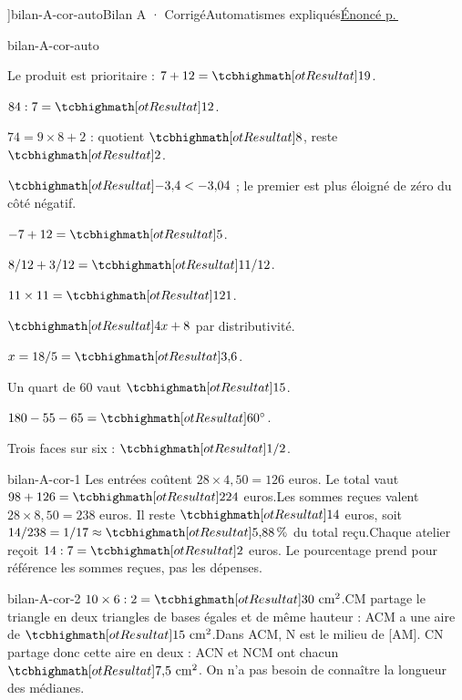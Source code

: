 \editionPage[\pdfbookmark[0]{Corrigés des bilans}{bm-bilan-A-cor-auto-parent}]{bilan-A-cor-auto}{Bilan A · Corrigé}{Automatismes expliqués}{\hyperref[bilan-A-auto]{Énoncé p.\,\pageref*{bilan-A-auto}}}
\begin{blocEdition}{bilan-A-cor-auto}
\begin{questions}
\item Le produit est prioritaire : $7+12=\res{19}$.
\item $84:7=\res{12}$.
\item $74=9\times8+2$ : quotient $\res8$, reste $\res2$.
\item $\res{-3{,}4<-3{,}04}$ ; le premier est plus éloigné de zéro du côté négatif.
\item $-7+12=\res5$.
\item $8/12+3/12=\res{11/12}$.
\item $11\times11=\res{121}$.
\item $\res{4x+8}$ par distributivité.
\item $x=18/5=\res{3{,}6}$.
\item Un quart de 60 vaut $\res{15}$.
\item $180-55-65=\res{60^\circ}$.
\item Trois faces sur six : $\res{1/2}$.\end{questions}
\end{blocEdition}
\begin{blocEdition}{bilan-A-cor-1}
Les entrées coûtent $28\times4{,}50=126$ euros. Le total vaut $98+126=\res{224}$ euros.Les sommes reçues valent $28\times8{,}50=238$ euros. Il reste $\res{14}$ euros, soit $14/238=1/17\approx\res{5{,}88\,\%}$ du total reçu.Chaque atelier reçoit $14:7=\res2$ euros. Le pourcentage prend pour référence les sommes reçues, pas les dépenses.
\end{blocEdition}
\begin{blocEdition}{bilan-A-cor-2}
$10\times6:2=\res{30\ \mathrm{cm}^2}$.CM partage le triangle en deux triangles de bases égales et de même hauteur : ACM a une aire de $\res{15\ \mathrm{cm}^2}$.Dans ACM, N est le milieu de [AM]. CN partage donc cette aire en deux : ACN et NCM ont chacun $\res{7{,}5\ \mathrm{cm}^2}$. On n’a pas besoin de connaître la longueur des médianes.\label{fig-bilan-A-cor-2}

\end{blocEdition}
